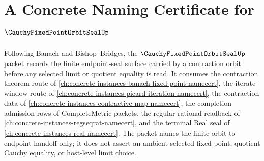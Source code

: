 \chapter{A Concrete Naming Certificate for $\CauchyFixedPointOrbitSealUp$}
\label{ch:concrete-instances-cauchy-fixed-point-orbit-seal-namecert}

Following Banach and Bishop--Bridges, the $\CauchyFixedPointOrbitSealUp$ packet records the finite endpoint-seal surface carried by a contraction orbit before any selected limit or quotient equality is read. It consumes the contraction theorem route of \autoref{ch:concrete-instances-banach-fixed-point-namecert}, the iterate-window route of \autoref{ch:concrete-instances-picard-iteration-namecert}, the contraction data of \autoref{ch:concrete-instances-contractive-map-namecert}, the completion admission rows of CompleteMetric packets, the regular rational readback of \autoref{ch:concrete-instances-regseqrat-namecert}, and the terminal Real seal of \autoref{ch:concrete-instances-real-namecert}. The packet names the finite orbit-to-endpoint handoff only; it does not assert an ambient selected fixed point, quotient Cauchy equality, or host-level limit choice.

